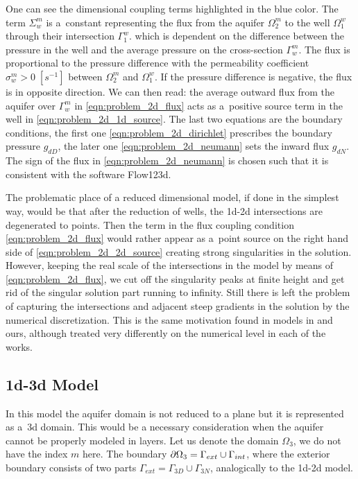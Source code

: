 One can see the dimensional coupling terms highlighted in the blue color.
The term $\Sigma^m_w$ is a~constant representing the flux from the aquifer $\Omega^m_2$ to the well $\Omega^w_1$
through their intersection $\Gamma^w_1$. 
which is dependent on the difference between the pressure in the well and the average pressure on the cross-section $\Gamma^m_w$.
The flux is proportional to the pressure difference with the permeability coefficient $\sigma^m_w>0\;[s^{-1}]$ between $\Omega^m_2$ and $\Omega^w_1$.
If the pressure difference is negative, the flux is in opposite direction.
We can then read: the average outward flux from the aquifer
over $\Gamma^m_w$ in \eqref{eqn:problem_2d_flux} acts as a~positive source term in the well in \eqref{eqn:problem_2d_1d_source}.
The last two equations are the boundary conditions, the first one \eqref{eqn:problem_2d_dirichlet} prescribes the boundary pressure $g_{dD}$, 
the later one \eqref{eqn:problem_2d_neumann} sets the inward flux $g_{dN}$. The sign of the flux in \eqref{eqn:problem_2d_neumann}
is chosen such that it is consistent with the software Flow123d.

The problematic place of a reduced dimensional model, if done in the simplest way, would be that after the reduction of wells,
the 1d-2d intersections are degenerated to points. Then the term in the flux coupling condition \eqref{eqn:problem_2d_flux} would rather
appear as a~point source on the right hand side of \eqref{eqn:problem_2d_2d_source} creating strong singularities in the solution.
However, keeping the real scale of the intersections in the model by means of \eqref{eqn:problem_2d_flux}, we cut off the singularity peaks
at finite height and get rid of the singular solution part running to infinity.
Still there is left the problem of capturing the intersections and adjacent steep gradients in the solution by the numerical discretization.
This is the same motivation found in models in \cite{gracie_modelling_2010,craig_using_2011,koppl_vidotto_2018} and ours,
although treated very differently on the numerical level in each of the works.

\subsection{1d-3d Model}
In this model the aquifer domain is not reduced to a plane but it is represented as a~3d domain.
This would be a necessary consideration when the aquifer cannot be properly modeled in layers.
Let us denote the domain $\Omega_3$, we do not have the index $m$ here.
The boundary $\partial\Omega_3 = \Gamma_{ext} \cup \Gamma_{int}$,
where the exterior boundary consists of two parts $\Gamma_{ext} = \Gamma_{3D} \cup \Gamma_{3N}$,
analogically to the 1d-2d model.

